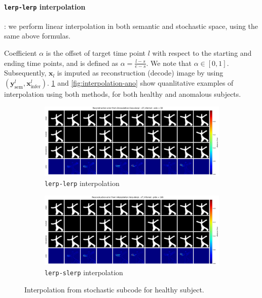 \paragraph{\texttt{lerp-lerp} interpolation}: we perform linear interpolation in both semantic and stochastic space, using the same above formulas. 

Coefficient $\alpha$ is the offset of target time point $l$ with respect to the starting and ending time points, and is defined as $\alpha = \frac{l - s}{e - s}$. We note that $\alpha \in [0, 1]$. Subsequently, $\mathbf{x}_l$ is imputed as reconstruction (decode) image by using $(\mathbf{y}_{\text{sem}}^l, \mathbf{x}_{\text{infer}}^l)$. \cref{fig:interpolation-healthy} and \cref{fig:interpolation-ano} show quanlitative examples of interpolation using both methods, for both healthy and anomalous subjects. 

\begin{figure}[htbp]
  \centering
  \begin{subfigure}{0.8\linewidth}
    \includegraphics[width=\linewidth]{figures/interpolation-lerp-lerp-id-50.pdf}
    \caption{\texttt{lerp-lerp} interpolation}
  \end{subfigure}

  \begin{subfigure}{0.8\linewidth}
    \includegraphics[width=\linewidth]{figures/interpolation-lerp-slerp-id-50.pdf}
    \caption{\texttt{lerp-slerp} interpolation}
  \end{subfigure}
  \caption{Interpolation from stochastic subcode for healthy subject. }
  \label{fig:interpolation-healthy}
\end{figure}

